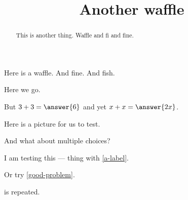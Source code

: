 \documentclass{ximera}
\title{Another waffle}
\begin{document}
\begin{abstract}
  This is another thing.  Waffle and fi and fine.
\end{abstract}
\maketitle

Here is a waffle.  And fine.  And fish.

Here we go.

\begin{problem}
  But $3 + 3 = \answer{6}$ and yet $x + x = \answer{2x}$.
\end{problem}

Here is a picture for us to test.

\begin{image}
\end{image}

And what about multiple choices?
\begin{problem}
\begin{multipleChoice}
\end{multipleChoice}
\end{problem}

I am testing this ---
 thing with \ref{a-label}.

Or try \ref{good-problem}.

\begin{theorem}
  \label{thm:another}
\end{theorem}

\begin{corollary}
  \label{thm:whee} is repeated.
\end{corollary}
\end{document}
